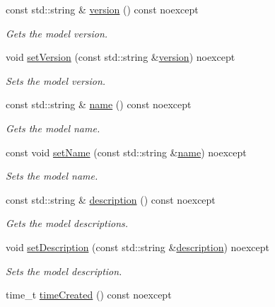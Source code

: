 \begin{DoxyCompactItemize}
const std\+::string \& \hyperlink{group___classification_module_ga496e4c5294b5438ff17456c9e9ab2c05}{version} () const noexcept
\begin{DoxyCompactList}\small\item\em Gets the model version. \end{DoxyCompactList}\item 
void \hyperlink{group___classification_module_ga0ad36321b38d014d2d2202cb6e4b3605}{set\+Version} (const std\+::string \&\hyperlink{group___classification_module_ga496e4c5294b5438ff17456c9e9ab2c05}{version}) noexcept
\begin{DoxyCompactList}\small\item\em Sets the model version. \end{DoxyCompactList}\item 
const std\+::string \& \hyperlink{group___classification_module_gaf7bb3eef7e80ac756645647def2ee78c}{name} () const noexcept
\begin{DoxyCompactList}\small\item\em Gets the model name. \end{DoxyCompactList}\item 
const void \hyperlink{group___classification_module_ga6cc776b17392c651dfab8be4f72cf06e}{set\+Name} (const std\+::string \&\hyperlink{group___classification_module_gaf7bb3eef7e80ac756645647def2ee78c}{name}) noexcept
\begin{DoxyCompactList}\small\item\em Sets the model name. \end{DoxyCompactList}\item 
const std\+::string \& \hyperlink{group___classification_module_ga495686b513e020bf0c809a5db7bfcf9c}{description} () const noexcept
\begin{DoxyCompactList}\small\item\em Gets the model descriptions. \end{DoxyCompactList}\item 
void \hyperlink{group___classification_module_gab541e1fec910b0073658b992b70fec23}{set\+Description} (const std\+::string \&\hyperlink{group___classification_module_ga495686b513e020bf0c809a5db7bfcf9c}{description}) noexcept
\begin{DoxyCompactList}\small\item\em Sets the model description. \end{DoxyCompactList}\item 
time\+\_\+t \hyperlink{group___classification_module_ga8e19bae617a659a8999b50a72720228f}{time\+Created} () const noexcept

\end{DoxyCompactItemize}
